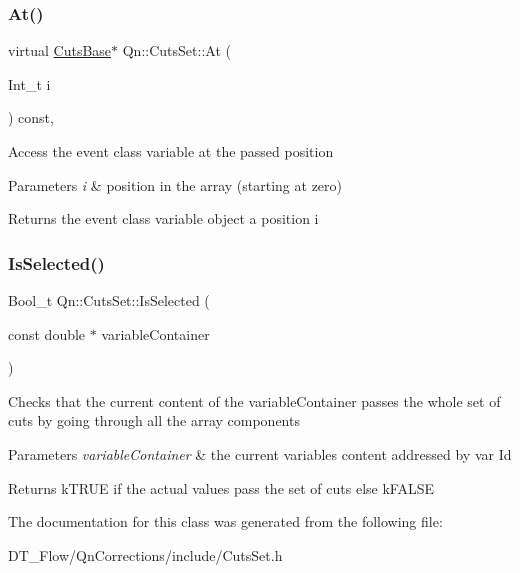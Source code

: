 \subsubsection{\texorpdfstring{At()}{At()}}
{\footnotesize\ttfamily virtual \mbox{\hyperlink{classQn_1_1CutsBase}{Cuts\+Base}}$\ast$ Qn\+::\+Cuts\+Set\+::\+At (\begin{DoxyParamCaption}\item[{Int\+\_\+t}]{i }\end{DoxyParamCaption}) const\hspace{0.3cm}{\ttfamily [inline]}, {\ttfamily [virtual]}}

Access the event class variable at the passed position 
\begin{DoxyParams}{Parameters}
{\em i} & position in the array (starting at zero) \\
\hline
\end{DoxyParams}
\begin{DoxyReturn}{Returns}
the event class variable object a position i 
\end{DoxyReturn}
\mbox{\label{classQn_1_1CutsSet_a69dc9eba4cdb1e1270bb9340212f20b7}} 
\subsubsection{\texorpdfstring{Is\+Selected()}{IsSelected()}}
{\footnotesize\ttfamily Bool\+\_\+t Qn\+::\+Cuts\+Set\+::\+Is\+Selected (\begin{DoxyParamCaption}\item[{const double $\ast$}]{variable\+Container }\end{DoxyParamCaption})\hspace{0.3cm}{\ttfamily [inline]}}

Checks that the current content of the variable\+Container passes the whole set of cuts by going through all the array components


\begin{DoxyParams}{Parameters}
{\em variable\+Container} & the current variables content addressed by var Id \\
\hline
\end{DoxyParams}
\begin{DoxyReturn}{Returns}
k\+T\+R\+UE if the actual values pass the set of cuts else k\+F\+A\+L\+SE 
\end{DoxyReturn}


The documentation for this class was generated from the following file\+:\begin{DoxyCompactItemize}
\item 
D\+T\+\_\+\+Flow/\+Qn\+Corrections/include/Cuts\+Set.\+h\end{DoxyCompactItemize}
